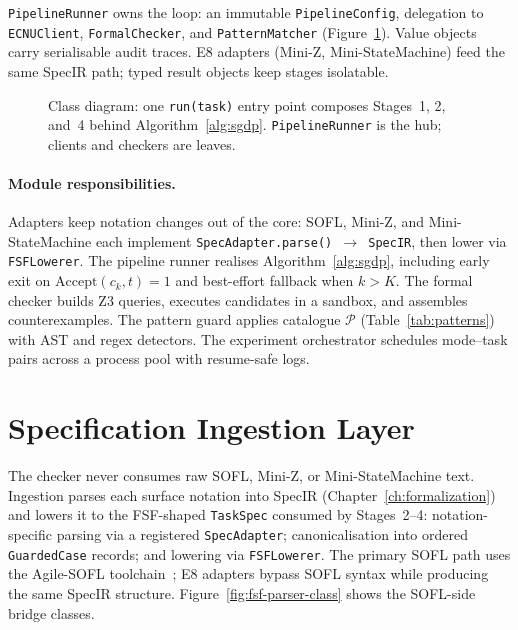 \texttt{PipelineRunner} owns the loop: an immutable \texttt{PipelineConfig},
delegation to \texttt{ECNUClient}, \texttt{FormalChecker}, and
\texttt{PatternMatcher} (Figure~\ref{fig:system-class}).
Value objects carry serialisable audit traces.
E8 adapters (Mini-Z, Mini-StateMachine) feed the same SpecIR path; typed
result objects keep stages isolatable.

\begin{figure}[t]
  \centering
  \caption{Class diagram: one \texttt{run(task)} entry point composes
    Stages~1, 2, and~4 behind Algorithm~\ref{alg:sgdp}.
    \texttt{PipelineRunner} is the hub; clients and checkers are leaves.}
  \label{fig:system-class}
\end{figure}

\paragraph{Module responsibilities.}
Adapters keep notation changes out of the core: SOFL, Mini-Z, and
Mini-StateMachine each implement \texttt{SpecAdapter.parse() $\to$ SpecIR},
then lower via \texttt{FSFLowerer}.
The pipeline runner realises Algorithm~\ref{alg:sgdp}, including early exit on
$\mathrm{Accept}(c_k,t)=1$ and best-effort fallback when $k > K$.
The formal checker builds Z3 queries, executes candidates in a sandbox, and
assembles counterexamples.
The pattern guard applies catalogue $\mathcal{P}$ (Table~\ref{tab:patterns})
with AST and regex detectors.
The experiment orchestrator schedules mode--task pairs across a process pool
with resume-safe logs.

\section{Specification Ingestion Layer}
\label{sec:impl:ingestion}

The checker never consumes raw SOFL, Mini-Z, or Mini-StateMachine text.
Ingestion parses each surface notation into SpecIR
(Chapter~\ref{ch:formalization}) and lowers it to the FSF-shaped
\texttt{TaskSpec} consumed by Stages~2--4:
notation-specific parsing via a registered \texttt{SpecAdapter};
canonicalisation into ordered \texttt{GuardedCase} records; and lowering via
\texttt{FSFLowerer}.
The primary SOFL path uses the Agile-SOFL
toolchain~\citep{li2022qrs_companion,liu2004soflbook}; E8 adapters bypass SOFL
syntax while producing the same SpecIR structure.
Figure~\ref{fig:fsf-parser-class} shows the SOFL-side bridge classes.

